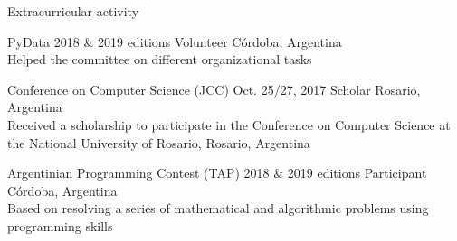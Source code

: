 \documentclass{curriculum}
\begin{document}
\begin{cvsection}{Extracurricular activity}

    \makesectionitemheader
        {PyData}                                            {2018 \& 2019 editions}
        {Volunteer}                                         {Córdoba, Argentina} \\
        \vspace{0.5ex}
        {Helped the committee on different organizational tasks}

    \makesectionitemheader
        {Conference on Computer Science (JCC)}              {Oct. 25/27, 2017}
        {Scholar}                                           {Rosario, Argentina} \\
        \vspace{0.5ex}
        {
            Received a scholarship to participate in the Conference on
            Computer Science at the National University of Rosario, Rosario, Argentina
        }

    \makesectionitemheader
        {Argentinian Programming Contest (TAP)}             {2018 \& 2019 editions}
        {Participant}                                       {Córdoba, Argentina} \\
        \vspace{0.5ex}
        {
            Based on resolving a series of mathematical and algorithmic
            problems using programming skills
        }

\end{cvsection}

\end{document}
